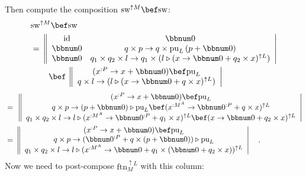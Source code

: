 Then compute the composition $\text{sw}^{\uparrow M}\bef\text{sw}$:
\begin{align*}
 & \text{sw}^{\uparrow M}\bef\text{sw}\\
 & =\,\left\Vert \begin{array}{cc}
\text{id} & \bbnum 0\\
\bbnum 0 & q\times p\rightarrow q\times\text{pu}_{L}\left(p+\bbnum 0\right)\\
\bbnum 0 & q_{1}\times q_{2}\times l\rightarrow q_{1}\times(l\triangleright(x\rightarrow\bbnum 0+q_{2}\times x)^{\uparrow L})
\end{array}\right|\\
 & \quad\quad\,\bef\,\left\Vert \begin{array}{c}
(x^{:P}\rightarrow x+\bbnum 0)\bef\text{pu}_{L}\\
q\times l\rightarrow(l\triangleright(x\rightarrow\bbnum 0+q\times x)^{\uparrow L})
\end{array}\right|
\end{align*}
\begin{align*}
 & =\,\,\left\Vert \begin{array}{c}
(x^{:P}\rightarrow x+\bbnum 0)\bef\text{pu}_{L}\\
q\times p\rightarrow\left(p+\bbnum 0\right)\triangleright\text{pu}_{L}\bef(x^{:M^{A}}\rightarrow\bbnum 0^{:P}+q\times x)^{\uparrow L}\\
q_{1}\times q_{2}\times l\rightarrow l\triangleright(x^{:M^{A}}\rightarrow\bbnum 0^{:P}+q_{1}\times x)^{\uparrow L}\bef(x\rightarrow\bbnum 0+q_{2}\times x)^{\uparrow L}
\end{array}\right|\\
 & =\,\left\Vert \begin{array}{c}
(x^{:P}\rightarrow x+\bbnum 0)\bef\text{pu}_{L}\\
q\times p\rightarrow(\bbnum 0^{:P}+q\times\left(p+\bbnum 0\right))\triangleright\text{pu}_{L}\\
q_{1}\times q_{2}\times l\rightarrow l\triangleright(x^{:M^{A}}\rightarrow\bbnum 0+q_{1}\times(\bbnum 0+q_{2}\times x))^{\uparrow L}
\end{array}\right|\quad.
\end{align*}
Now we need to post-compose $\text{ftn}_{M}^{\uparrow L}$ with this
column:
